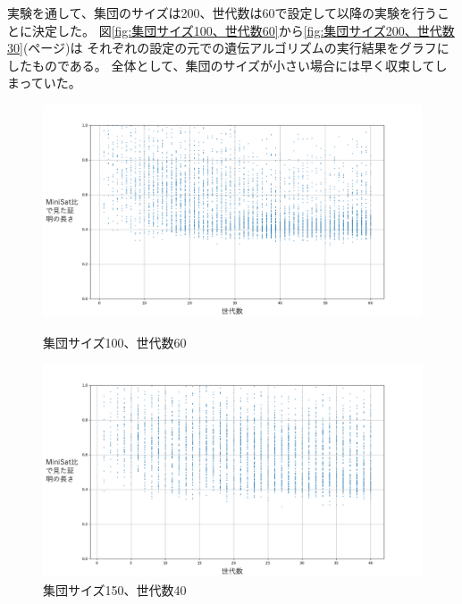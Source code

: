 実験を通して、集団のサイズは200、世代数は60で設定して以降の実験を行うことに決定した。
図\ref{fig:集団サイズ100、世代数60}から\ref{fig:集団サイズ200、世代数30}(\pageref{fig:集団サイズ100、世代数60}ページ)は
それぞれの設定の元での遺伝アルゴリズムの実行結果をグラフにしたものである。
全体として、集団のサイズが小さい場合には早く収束してしまっていた。

\begin{figure}[h]
    \centering
    \begin{minipage}{0.43\columnwidth}
        \centering
        \includegraphics[width=1.2\columnwidth]{figures/Experiment1/4-1.png}
        \caption{集団サイズ100、世代数60}
        \label{fig:集団サイズ100、世代数60}
    \end{minipage}
    \hspace{5mm}
    \begin{minipage}{0.43\columnwidth}
        \centering
        \includegraphics[width=1.2\columnwidth]{figures/Experiment1/4-2.png}
        \caption{集団サイズ150、世代数40}
        \label{fig:集団サイズ150、世代数40}
    \end{minipage}
  

\end{figure}
